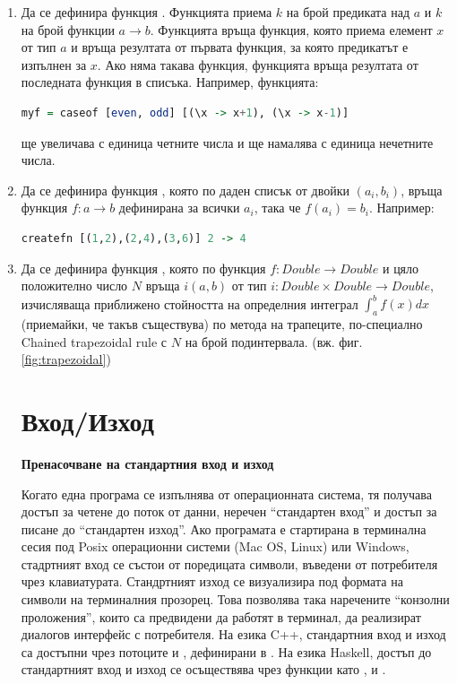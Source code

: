 \begin{enumerate}[resume]
	\item Да се дефинира функция . Функцията приема $k$ на брой предиката над $a$ и $k$ на брой функции $a\rightarrow b$. Функцията  връща функция, която приема елемент $x$ от тип $a$ и връща резултата от първата функция, за която предикатът е изпълнен за $x$. Ако няма такава функция, функцията връща резултата от последната функция в списъка. Например, функцията:
\begin{lstlisting}[basicstyle=\small,language=Haskell]
myf = caseof [even, odd] [(\x -> x+1), (\x -> x-1)]
\end{lstlisting}
	ще увеличава с единица четните числа и ще намалява с единица нечетните числа.
		
	\item   Да се дефинира функция , която по даден списък от двойки $(a_i,b_i)$, връща функция $f:a \rightarrow b$ дефинирана за всички $a_i$, така че $f(a_i)=b_i$. Например:

\begin{lstlisting}[basicstyle=\small,language=Haskell]
createfn [(1,2),(2,4),(3,6)] 2 -> 4
\end{lstlisting}

\item Да се дефинира функция , която по функция $f: Double \rightarrow Double$ и цяло положително число $N$ връща $i(a,b)$ от тип $i:Double \times Double \rightarrow Double$, изчисляваща приближено стойността на определния интеграл $\int_{a}^{b} f(x) dx$ (приемайки, че такъв съществува) по метода на трапеците, по-специално Chained trapezoidal rule\cite{trapezoidal} с $N$ на брой подинтервала. (вж. фиг. \ref{fig:trapezoidal})

\section {Вход/Изход}


\begin{mdframed}[hidealllines=true,backgroundcolor=gray!20]
\textbf{Пренасочване на стандартния вход и изход}

Когато една програма се изпълнява от операционната система, тя получава достъп за четене до поток от данни, неречен ``стандартен вход'' и достъп за писане до ``стандартен изход''. Ако програмата е стартирана в терминална сесия под Posix операционни системи (Mac OS, Linux) или Windows, стадртният вход се състои от поредицата символи, въведени от потребителя чрез клавиатурата. Стандртният изход се визуализира под формата на символи на терминалния прозорец. Това позволява така наречените ``конзолни проложения'', които са предвидени да работят в терминал, да реализират диалогов интерфейс с потребителя. На езика C++, стандартния вход и изход са достъпни чрез потоците  и , дефинирани в . На езика Haskell, достъп до стандартният вход и изход се осъществява чрез функции като ,  и .


\end{mdframed}
\end{enumerate}
